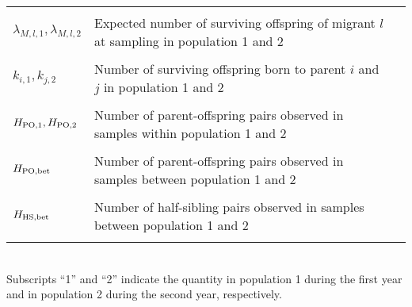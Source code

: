 \documentclass[12pt, English]{article}
\begin{document}
\begin{spacing}{1.9}
\begin{table}[tb]
\begin{tabular}{llc}
		                						& \\
	$\lambda_{M,l,1}, \lambda_{M,l,2}$		& Expected number of surviving offspring of migrant $l$ at sampling in population 1 and 2\\
		                						& \\
	$k_{i,1}, k_{j,2}$					& Number of surviving offspring born to parent $i$ and $j$ in population 1 and 2\\ 
	                							& \\
	$H_{\rm PO, 1}, H_{\rm PO, 2}$		& Number of parent-offspring pairs observed in samples within population 1 and 2\\ 
	                							& \\
	$H_{\rm PO, bet}$					& Number of parent-offspring pairs observed in samples between population 1 and 2\\ 
	                							& \\
	$H_{\rm HS, bet}$					& Number of half-sibling pairs observed in samples between population 1 and 2\\ 
	                							& \\              		
	\hline
    \end{tabular}
    \label{symbols} 
\\Subscripts ``1'' and ``2'' indicate the quantity in population 1 during the first year and in population 2 during the second year, respectively. 
\end{table}
\renewcommand{\arraystretch}{1}

\clearpage


\end{spacing}
\end{document}
